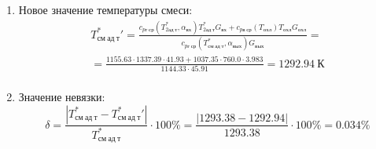 \documentclass[a4paper,12pt]{article}
\begin{document}
\begin{enumerate}
\begin{enumerate}
            \item Новое значение температуры смеси:
            \begin{gather*}
                T_{см\ ад\ т}^*\prime = \frac{
                        c_{pг\ ср} (T_{2ад\ т}^*, \alpha_{вх}) T_{2ад\ т}^* G_{вх} + c_{pв\ ср} (T_{охл}) T_{охл} G_{охл}
                    }{
                        c_{pг\ ср} (T_{см\ ад\ т}^{*}, \alpha_{вых}) G_{вых}
                    } =\\
                = \frac{
                    1155.63
                    \cdot 1337.39 \cdot 41.93 +
                    1037.35
                    \cdot 760.0 \cdot 3.983
                }{
                    1144.33
                    \cdot  45.91
                } =
                1292.94\ К\\
            \end{gather*}

            \item Значение невязки:
            \[
                \delta = \frac{ \left| T_{см\ ад\ т}^{*} - T_{см\ ад\ т}^*\prime \right| }{T_{см\ ад\ т}^{*}} \cdot 100 \% =
                    \frac{
                        \left| 1293.38 - 1292.94 \right|
                    }{
                        1293.38
                    } \cdot 100 \% =
                0.034 \%
            \]
        \end{enumerate}

        

    \end{enumerate}
    
\end{document}
